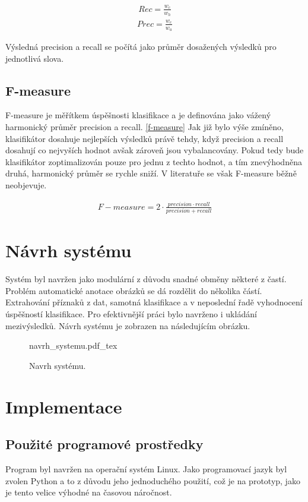 \documentclass[czech,BP]{thesiskiv}
\begin{document}
\begin{align}
   \label{recall} Rec = \frac{w_c}{w_h}
\end{align}
\begin{align}
   \label{precision} Prec = \frac{w_c}{w_a}
\end{align}

\par Výsledná precision a recall se počítá jako průměr dosažených výsledků pro jednotlivá slova. 

\section{F-measure}
F-measure je měřítkem úspěšnosti klasifikace a je definována jako vážený harmonický průměr precision a recall. \eqref{f-measure} Jak již bylo výše zmíněno, klasifikátor dosahuje nejlepších výsledků právě tehdy, když precision a recall dosahují co nejvyších hodnot avšak zároveň jsou vybalancovány. Pokud tedy bude klasifikátor zoptimalizován pouze pro jednu z techto hodnot, a tím znevýhodněna druhá, harmonický průměr se rychle sniží. V literatuře se však F-measure běžně neobjevuje.

\begin{align}
   \label{f-measure} F-measure = 2 \cdot \frac{precision \cdot recall}{precision + recall}
\end{align}


\chapter{Návrh systému}
Systém byl navržen jako modulární z důvodu snadné obměny některé z častí. Problém automatické anotace obrázků se dá rozdělit do několika částí. Extrahování příznaků z dat, samotná klasifikace a v neposlední řadě vyhodnocení úspěšností klasifikace. Pro efektivnější práci bylo navrženo i ukládání mezivýsledků. Návrh systému je zobrazen na následujícím obrázku.


\begin{figure}[ht]
    \centering
    \label{navrh_systemu}
    \def\svgwidth{\columnwidth}
    {navrh_systemu.pdf_tex} 
    \caption{Navrh systému.}
\end{figure}


\chapter{Implementace}
\section{Použité programové prostředky}
\par Program byl navržen na operační systém Linux. Jako programovací jazyk byl zvolen Python a to z důvodu jeho jednoduchého použití, což je na prototyp, jako je tento velice výhodné na časovou náročnost. 
\end{document}
